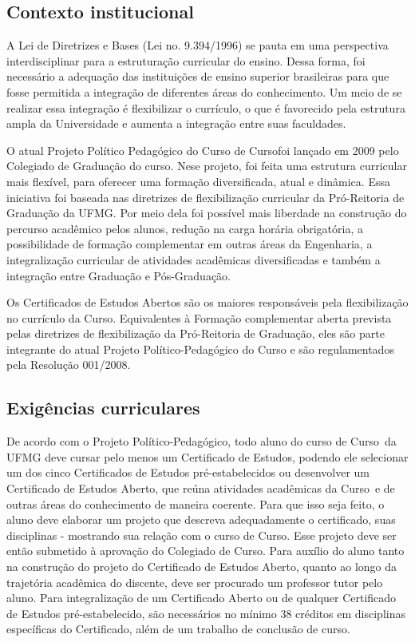 \documentclass{article}
\newcommand{\curso}{Curso} %
\begin{document}
	\subsection{Contexto institucional}
	A Lei de Diretrizes e Bases (Lei no. 9.394/1996) se pauta em uma perspectiva interdisciplinar para a estruturação curricular do ensino. Dessa forma, foi necessário a adequação das instituições de ensino superior brasileiras para que fosse permitida a integração de diferentes áreas do conhecimento. Um meio de se realizar essa integração é flexibilizar o currículo, o que é favorecido pela estrutura ampla da Universidade e aumenta a integração entre suas faculdades. \par
	O atual Projeto Político Pedagógico do Curso de \curso foi lançado em 2009 pelo Colegiado de Graduação do curso. Nese projeto, foi feita uma estrutura curricular mais flexível, para oferecer uma formação diversificada, atual e dinâmica. Essa iniciativa foi baseada nas diretrizes de flexibilização curricular da Pró-Reitoria de Graduação da UFMG. Por meio dela foi possível mais liberdade na construção do percurso acadêmico pelos alunos, redução na carga horária obrigatória, a possibilidade de formação complementar em outras áreas da Engenharia, a integralização curricular de atividades acadêmicas diversificadas e também a integração entre Graduação e Pós-Graduação. \par
	Os Certificados de Estudos Abertos são os maiores responsáveis pela flexibilização no currículo da \curso. Equivalentes à Formação complementar aberta prevista pelas diretrizes de flexibilização da Pró-Reitoria de Graduação, eles são parte integrante do atual Projeto Político-Pedagógico do Curso e são regulamentados pela Resolução 001/2008.
	
	\subsection{Exigências curriculares}
	De acordo com o Projeto Político-Pedagógico, todo aluno do curso de \curso \  da UFMG deve cursar pelo menos um Certificado de Estudos, podendo ele selecionar um dos cinco Certificados de Estudos pré-estabelecidos ou desenvolver um Certificado de Estudos Aberto, que reúna atividades acadêmicas da \curso \ e de outras áreas do conhecimento de maneira coerente. Para que isso seja feito, o aluno deve elaborar um projeto que descreva adequadamente o certificado, suas disciplinas - mostrando sua relação com o curso de \curso. Esse projeto deve ser então submetido à aprovação do Colegiado de \curso. Para auxílio do aluno tanto na construção do projeto do Certificado de Estudos Aberto, quanto ao longo da trajetória acadêmica do discente, deve ser procurado um professor tutor pelo aluno. Para integralização de um Certificado Aberto ou de qualquer Certificado de Estudos pré-estabelecido, são necessários no mínimo 38 créditos em disciplinas específicas do Certificado, além de um trabalho de conclusão de curso.
	
\end{document}
